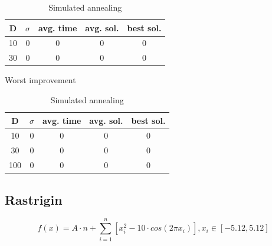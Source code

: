 \documentclass{article}
\begin{document}
\begin{table}[!htbp]
\begin{minipage}{.4\linewidth}
    \centering

    \begin{tabular}{|c|c|c|c|c|}
    \hline
    D   & $\sigma$  & avg. time     & avg. sol.     & best sol. \\
    \hline
    10  & 0         & 0             & 0             & 0 \\
    \hline
    30  & 0         & 0             & 0             & 0 \\
    \hline
    \end{tabular}
    \caption{Worst improvement}
  \end{minipage}%
  \quad %
  \begin{minipage}{.75\linewidth}
    \centering

    \begin{tabular}{|c|c|c|c|c|}
    \hline
    D   & $\sigma$  & avg. time     & avg. sol.     & best sol. \\
    \hline
    10  & 0         & 0             & 0             & 0 \\
    \hline
    30  & 0         & 0             & 0             & 0 \\
    \hline
    100 & 0         & 0             & 0             & 0 \\
    \hline
    \end{tabular}
    \caption{Simulated annealing}
  \end{minipage}
\end{table}

\newpage
\setcounter{table}{0}


\subsection{Rastrigin}
$$ f(x) = A \cdot n + \sum_{i=1}^n \left[ x_i^2 - 10 \cdot cos(2 \pi x_i) \right] , x_i \in \left[ -5.12, 5.12 \right] $$

\end{document}
